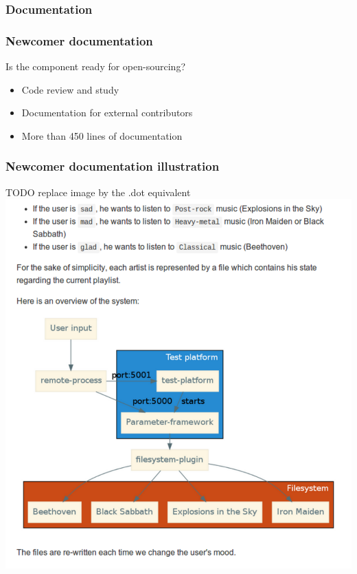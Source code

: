 \subsubsection{Documentation}
\begin{frame}
    \frametitle{Newcomer documentation}
    \centering
    \begin{block}{Is the component ready for open-sourcing?}
        \begin{itemize}
            \item Code review and study
            \item Documentation for external contributors
            \item More than 450 lines of documentation
        \end{itemize}
    \end{block}
\end{frame}

\begin{frame}
    \frametitle{Newcomer documentation illustration}
    \centering
    TODO replace image by the .dot equivalent
    \includegraphics[height=0.85\textheight]{../../report/src/img/tutos.pdf}
\end{frame}

